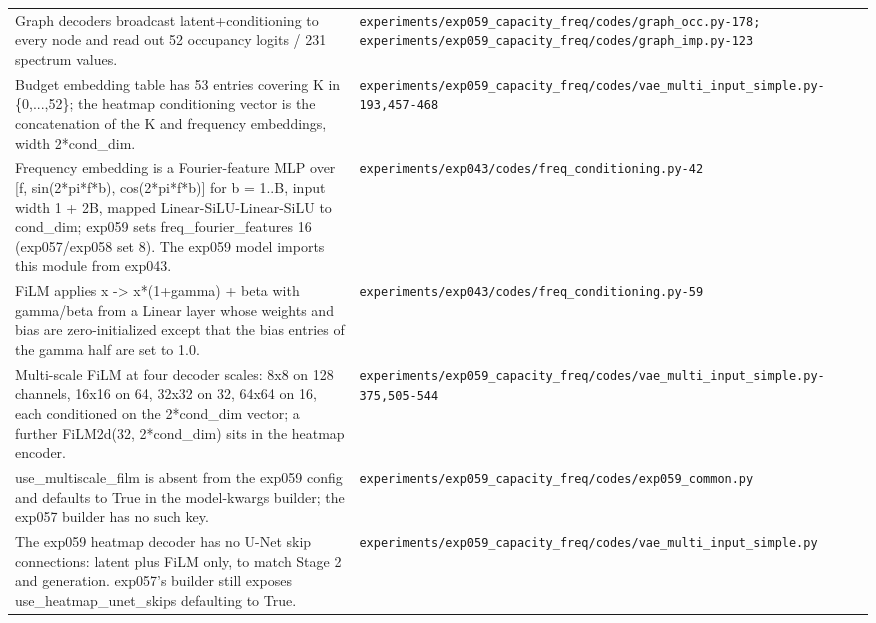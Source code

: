 \begin{longtable}{p{} p{}}
Graph decoders broadcast latent+conditioning to every node and read out 52 occupancy logits / 231 spectrum values. & \texttt{experiments/\allowbreak{}exp059\_\allowbreak{}capacity\_\allowbreak{}freq/\allowbreak{}codes/\allowbreak{}graph\_\allowbreak{}occ.py-178; experiments/\allowbreak{}exp059\_\allowbreak{}capacity\_\allowbreak{}freq/\allowbreak{}codes/\allowbreak{}graph\_\allowbreak{}imp.py-123} \\
Budget embedding table has 53 entries covering K in \{0,...,52\}; the heatmap conditioning vector is the concatenation of the K and frequency embeddings, width 2*cond\_dim. & \texttt{experiments/\allowbreak{}exp059\_\allowbreak{}capacity\_\allowbreak{}freq/\allowbreak{}codes/\allowbreak{}vae\_\allowbreak{}multi\_\allowbreak{}input\_\allowbreak{}simple.py-193,457-468} \\
Frequency embedding is a Fourier-feature MLP over [f, sin(2*pi*f*b), cos(2*pi*f*b)] for b = 1..B, input width 1 + 2B, mapped Linear-SiLU-Linear-SiLU to cond\_dim; exp059 sets freq\_fourier\_features 16 (exp057/exp058 set 8). The exp059 model imports this module from exp043. & \texttt{experiments/\allowbreak{}exp043/\allowbreak{}codes/\allowbreak{}freq\_\allowbreak{}conditioning.py-42} \\
FiLM applies x -> x*(1+gamma) + beta with gamma/beta from a Linear layer whose weights and bias are zero-initialized except that the bias entries of the gamma half are set to 1.0. & \texttt{experiments/\allowbreak{}exp043/\allowbreak{}codes/\allowbreak{}freq\_\allowbreak{}conditioning.py-59} \\
Multi-scale FiLM at four decoder scales: 8x8 on 128 channels, 16x16 on 64, 32x32 on 32, 64x64 on 16, each conditioned on the 2*cond\_dim vector; a further FiLM2d(32, 2*cond\_dim) sits in the heatmap encoder. & \texttt{experiments/\allowbreak{}exp059\_\allowbreak{}capacity\_\allowbreak{}freq/\allowbreak{}codes/\allowbreak{}vae\_\allowbreak{}multi\_\allowbreak{}input\_\allowbreak{}simple.py-375,505-544} \\
use\_multiscale\_film is absent from the exp059 config and defaults to True in the model-kwargs builder; the exp057 builder has no such key. & \texttt{experiments/\allowbreak{}exp059\_\allowbreak{}capacity\_\allowbreak{}freq/\allowbreak{}codes/\allowbreak{}exp059\_\allowbreak{}common.py} \\
The exp059 heatmap decoder has no U-Net skip connections: latent plus FiLM only, to match Stage 2 and generation. exp057's builder still exposes use\_heatmap\_unet\_skips defaulting to True. & \texttt{experiments/\allowbreak{}exp059\_\allowbreak{}capacity\_\allowbreak{}freq/\allowbreak{}codes/\allowbreak{}vae\_\allowbreak{}multi\_\allowbreak{}input\_\allowbreak{}simple.py} \\

\end{longtable}
